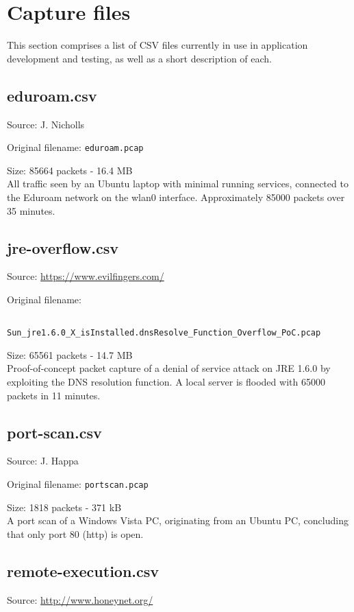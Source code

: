 \documentclass[12pt,a4paper]{article}
\newcommand{\dbl}{\\[\baselineskip]}
\begin{document}
    \pagebreak

    \section{Capture files}
        This section comprises a list of CSV files currently in use in
        application development and testing, as well as a short
        description of each.

        \subsection{eduroam.csv}
            Source: J. Nicholls

            Original filename: \verb!eduroam.pcap!

            Size: 85664 packets - 16.4 MB \dbl
            All traffic seen by an Ubuntu laptop with minimal running
            services, connected to the Eduroam network on the wlan0
            interface. Approximately 85000 packets over 35 minutes.

        \subsection{jre-overflow.csv}
            Source: \url{https://www.evilfingers.com/}

            Original filename:

            \verb!        Sun_jre1.6.0_X_isInstalled.dnsResolve_Function_Overflow_PoC.pcap!

            Size: 65561 packets - 14.7 MB \dbl
            Proof-of-concept packet capture of a denial of service
            attack on JRE 1.6.0 by exploiting the DNS resolution
            function. A local server is flooded with 65000 packets in
            11 minutes.

        \subsection{port-scan.csv}
            Source: J. Happa

            Original filename: \verb!portscan.pcap!

            Size: 1818 packets - 371 kB \dbl
            A port scan of a Windows Vista PC, originating from an
            Ubuntu PC, concluding that only port 80 (http) is open.

        \subsection{remote-execution.csv}
            Source: \url{http://www.honeynet.org/}
\end{document}
